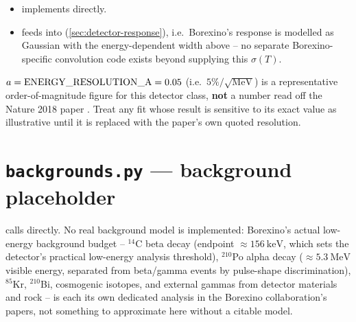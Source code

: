 \begin{implbox}
\begin{itemize}
  \item {}
    implements  directly.
  \item {} feeds  into
    (\cref{sec:detector-response}), i.e.\ Borexino's response is modelled as
    Gaussian with the energy-dependent width above -- no separate
    Borexino-specific convolution code exists beyond supplying this
    $\sigma(T)$.
\end{itemize}
\end{implbox}

\begin{notebox}
$a={\rm ENERGY\_RESOLUTION\_A}=0.05$ (i.e.\ $5\%/\sqrt{\mathrm{MeV}}$) is a
representative order-of-magnitude figure for this detector class, \textbf{not}
a number read off the Nature 2018 paper \parencite{Agostini2018Borexino}.
Treat any fit whose result is sensitive to its exact value as illustrative
until it is replaced with the paper's own quoted resolution.
\end{notebox}

\section{\texttt{backgrounds.py} --- background placeholder}


\begin{implbox}
 calls
 directly. No real
background model is implemented: Borexino's actual low-energy background
budget -- $^{14}$C beta decay (endpoint $\approx156\ \mathrm{keV}$, which
sets the detector's practical low-energy analysis threshold), $^{210}$Po
alpha decay ($\approx5.3\ \mathrm{MeV}$ visible energy, separated from
beta/gamma events by pulse-shape discrimination), $^{85}$Kr, $^{210}$Bi,
cosmogenic isotopes, and external gammas from detector materials and rock --
is each its own dedicated analysis in the Borexino collaboration's papers,
not something to approximate here without a citable model.
\end{implbox}

